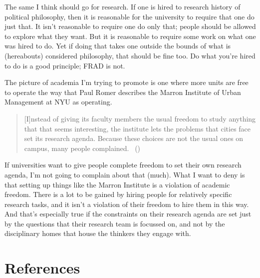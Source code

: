 \documentclass[
  11pt,
  letterpaper,
  DIV=11,
  numbers=noendperiod,
  twoside]{scrartcl}
\begin{document}
The same I think should go for research. If one is hired to research
history of political philosophy, then it is reasonable for the
university to require that one do just that. It isn't reasonable to
require one do only that; people should be allowed to explore what they
want. But it is reasonable to require some work on what one was hired to
do. Yet if doing that takes one outside the bounds of what is
(hereabouts) considered philosophy, that should be fine too. Do what
you're hired to do is a good principle; FRAD is not.

The picture of academia I'm trying to promote is one where more units
are free to operate the way that Paul Romer describes the Marron
Institute of Urban Management at NYU as operating.

\begin{quote}
{[}I{]}nstead of giving its faculty members the usual freedom to study
anything that that seems interesting, the institute lets the problems
that cities face set its research agenda. Because these choices are not
the usual ones on campus, many people complained.
~()
\end{quote}

If universities want to give people complete freedom to set their own
research agenda, I'm not going to complain about that (much). What I
want to deny is that setting up things like the Marron Institute is a
violation of academic freedom. There is a lot to be gained by hiring
people for relatively specific research tasks, and it isn't a violation
of their freedom to hire them in this way. And that's especially true if
the constraints on their research agenda are set just by the questions
that their research team is focussed on, and not by the disciplinary
homes that house the thinkers they engage with.

\section*{References}\label{references}
\end{document}
